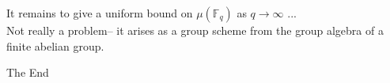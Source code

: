 \documentclass{beamer}
\begin{document}
\begin{frame}
It remains to give a uniform bound on $\mu(\mathbb{F}_{q})$ as $q\rightarrow \infty$ ...\\
\pause
\vspace{1cm}
Not really a problem-- it arises as a group scheme from the group algebra of a finite abelian group. 
\end{frame}


\begin{frame}
\Huge{\centerline{The End}}
\end{frame}

\end{document}
